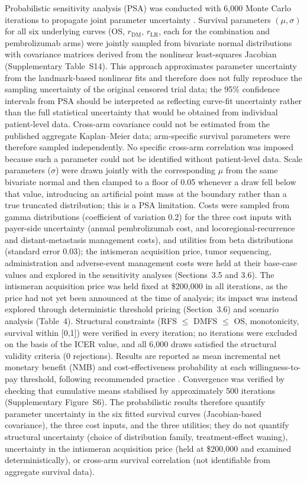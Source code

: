 \documentclass[12pt,a4paper]{article}
\begin{document}
Probabilistic sensitivity analysis (PSA) was conducted with 6,000 Monte Carlo iterations to propagate joint parameter uncertainty \cite{briggs2006}. Survival parameters $(\mu, \sigma)$ for all six underlying curves (OS, $r_{\text{DM}}$, $r_{\text{LR}}$, each for the combination and \mbox{pembrolizumab} arms) were jointly sampled from bivariate normal distributions with covariance matrices derived from the nonlinear least-squares Jacobian (Supplementary Table~S14). This approach approximates parameter uncertainty from the landmark-based nonlinear fits and therefore does not fully reproduce the sampling uncertainty of the original censored trial data; the 95\% confidence intervals from PSA should be interpreted as reflecting curve-fit uncertainty rather than the full statistical uncertainty that would be obtained from individual patient-level data. Cross-arm covariance could not be estimated from the published aggregate Kaplan--Meier data; arm-specific survival parameters were therefore sampled independently. No specific cross-arm correlation was imposed because such a parameter could not be identified without patient-level data. Scale parameters ($\sigma$) were drawn jointly with the corresponding $\mu$ from the same bivariate normal and then clamped to a floor of 0.05 whenever a draw fell below that value, introducing an artificial point mass at the boundary rather than a true truncated distribution; this is a PSA limitation. Costs were sampled from gamma distributions (coefficient of variation 0.2) for the three cost inputs with payer-side uncertainty (annual pembrolizumab cost, and locoregional-recurrence and distant-metastasis management costs), and utilities from beta distributions (standard error 0.03); the intismeran acquisition price, tumor sequencing, administration and adverse-event management costs were held at their base-case values and explored in the sensitivity analyses (Sections~3.5 and 3.6). The intismeran acquisition price was held fixed at \$200,000 in all iterations, as the price had not yet been announced at the time of analysis; its impact was instead explored through deterministic threshold pricing (Section~3.6) and scenario analysis (Table~4). Structural constraints (RFS $\leq$ DMFS $\leq$ OS, monotonicity, survival within [0,1]) were verified in every iteration; no iterations were excluded on the basis of the ICER value, and all 6,000 draws satisfied the structural validity criteria (0 rejections). Results are reported as mean incremental net monetary benefit (NMB) and cost-effectiveness probability at each willingness-to-pay threshold, following recommended practice \cite{stinnett1998, fenwick2004}. Convergence was verified by checking that cumulative means stabilised by approximately 500 iterations (Supplementary Figure~S6). The probabilistic results therefore quantify parameter uncertainty in the six fitted survival curves (Jacobian-based covariance), the three cost inputs, and the three utilities; they do not quantify structural uncertainty (choice of distribution family, treatment-effect waning), uncertainty in the intismeran acquisition price (held at \$200,000 and examined deterministically), or cross-arm survival correlation (not identifiable from aggregate survival data).
\end{document}
